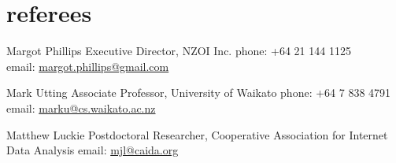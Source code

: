 \documentclass[]{boris-cv}
\begin{document}
\section{referees}

  {Margot Phillips}
  {Executive Director, NZOI Inc.}
  {phone: +64 21 144 1125
  \\email: \href{mailto:margot.phillips@gmail.com}{margot.phillips@gmail.com}}

  {Mark Utting}
  {Associate Professor, University of Waikato}
  {phone: +64 7 838 4791
  \\email: \href{mailto:marku@cs.waikato.ac.nz}
  {marku@cs.waikato.ac.nz}}

  {Matthew Luckie}
  {Postdoctoral Researcher,
  Cooperative Association for Internet Data Analysis}
  {email: \href{mailto:mjl@caida.org}{mjl@caida.org}}
\end{document}
